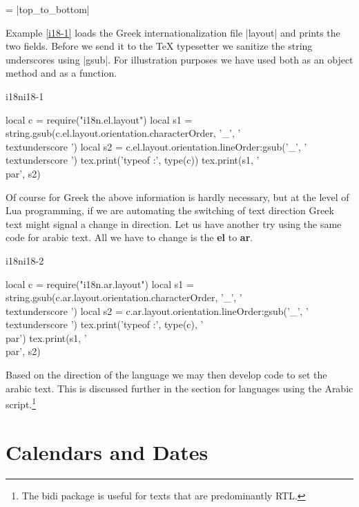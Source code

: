 = |top_to_bottom|

Example \ref{i18-1} loads the Greek internationalization file |layout| and prints the two fields. Before we send it to
the TeX typesetter we sanitize the string underscores using |gsub|. For illustration purposes we have used  both as an object method and as a function.

\begin{texexample}{i18n}{i18-1}
\begin{luacode}
local c = require("i18n.el.layout")
local s1 = string.gsub(c.el.layout.orientation.characterOrder, '_', '\\textunderscore ')
local s2 = c.el.layout.orientation.lineOrder:gsub('_', '\\textunderscore ')
tex.print('typeof :', type(c))
tex.print(s1, '\\par', s2)
\end{luacode}
\end{texexample}

Of course for Greek the above information is hardly necessary, but at the level of Lua programming, if we are automating the switching of text direction Greek text might signal a change in direction. Let us have another try using the same code for arabic text. All we have to change is the \textbf{el} to \textbf{ar}.

\begin{texexample}{i18n}{i18-2}
\begin{luacode}
local c = require("i18n.ar.layout")
local s1 = string.gsub(c.ar.layout.orientation.characterOrder, '_', '\\textunderscore ')
local s2 = c.ar.layout.orientation.lineOrder:gsub('_', '\\textunderscore ')
tex.print('typeof :', type(c), '\\par')
tex.print(s1, '\\par', s2)
\end{luacode}
\end{texexample}

Based on the direction of the language we may then develop code to set the arabic text. This is discussed further
in the section for languages using the Arabic script.\footnote{The bidi package is useful for texts that are predominantly RTL.}

\section{Calendars and Dates}


